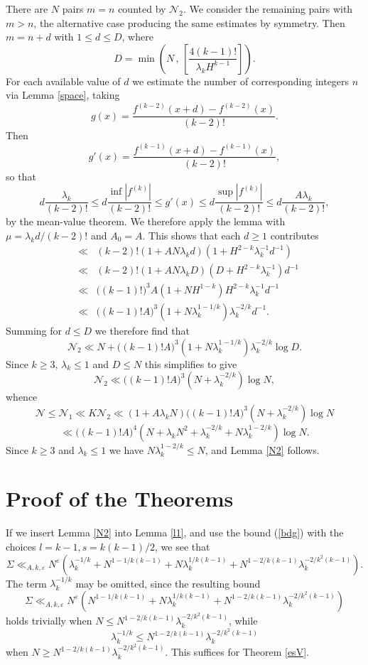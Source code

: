 \documentclass[a4paper,10pt]{article}
\newcommand{\ep}{\varepsilon}
\newcommand{\lk}{\lambda_k}
\begin{document}
There are $N$ pairs $m=n$ counted by $\mathcal{N}_2$. We consider
the remaining pairs with $m>n$, the alternative case producing the
same estimates by symmetry.  Then $m=n+d$ with $1\le d\le D$, where 
\[D=\min\left(N\,,\,\left[\frac{4(k-1)!}{\lk H^{k-1}}\right]\right).\]
For each available value of $d$ we estimate the number of
corresponding integers $n$ via Lemma \ref{space}, taking
\[g(x)=\frac{f^{(k-2)}(x+d)-f^{(k-2)}(x)}{(k-2)!}.\]
Then
\[g'(x)=\frac{f^{(k-1)}(x+d)-f^{(k-1)}(x)}{(k-2)!},\]
so that
\[d\frac{\lk}{(k-2)!}\le d\frac{\inf |f^{(k)}|}{(k-2)!}\le g'(x)\le
d\frac{\sup |f^{(k)}|}{(k-2)!}\le d\frac{A\lk}{(k-2)!},\]
by the mean-value theorem. We therefore apply the lemma with $\mu=
\lk d/(k-2)!$ and $A_0=A$. This shows that each $d\ge 1$ contributes
\begin{eqnarray*}
&\ll& (k-2)!(1+AN\lk d)(1+H^{2-k}\lk^{-1}d^{-1})\\
&\ll& (k-2)!(1+AN\lk D)(D+H^{2-k}\lk^{-1})d^{-1}\\
&\ll& \big((k-1)!\big)^3A(1+NH^{1-k})H^{2-k}\lk^{-1}d^{-1}\\
&\ll& \big((k-1)!A\big)^3(1+N\lk^{1-1/k})\lk^{-2/k}d^{-1}.
\end{eqnarray*}
Summing for $d\le D$ we therefore find that
\[\mathcal{N}_2\ll N+\big((k-1)!A\big)^3(1+N\lk^{1-1/k})\lk^{-2/k}\log D.\]
Since $k\ge 3$, $\lk\le 1$ and $D\le N$ this simplifies to give
\[\mathcal{N}_2\ll \big((k-1)!A\big)^3(N+\lk^{-2/k})\log N,\]
whence
\[\mathcal{N}\le\mathcal{N}_1\ll K\mathcal{N}_2\ll (1+A\lk N)
\big((k-1)!A\big)^3(N+\lk^{-2/k})\log N\]
\[\ll \big((k-1)!A\big)^4(N+\lk N^2+\lk^{-2/k}+N\lk^{1-2/k})\log N.\]
Since $k\ge 3$ and $\lk\le 1$ we have $N\lk^{1-2/k}\le N$, and 
Lemma \ref{N2} follows.

\section{Proof of the Theorems}\label{sPT}

If we insert Lemma \ref{N2} into Lemma \ref{l1}, and use the bound
(\ref{bdg}) with the choices $l=k-1, s=k(k-1)/2$, we see that
\[\Sigma\ll_{A,k,\ep}
N^{\ep}(\lk^{-1/k}+N^{1-1/k(k-1)}+N\lk^{1/k(k-1)}
+N^{1-2/k(k-1)}\lk^{-2/k^2(k-1)}).\]
The term $\lk^{-1/k}$ may be omitted, since the resulting bound
\[\Sigma\ll_{A,k,\ep}N^{\ep}(N^{1-1/k(k-1)}+N\lk^{1/k(k-1)}
+N^{1-2/k(k-1)}\lk^{-2/k^2(k-1)})\]
holds trivially when $N\le N^{1-2/k(k-1)}\lk^{-2/k^2(k-1)}$, while
\[\lk^{-1/k}\le N^{1-2/k(k-1)}\lk^{-2/k^2(k-1)}\]
when $N\ge N^{1-2/k(k-1)}\lk^{-2/k^2(k-1)}$.
This suffices for Theorem \ref{esV}.
\end{document}
